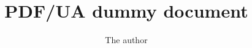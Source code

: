 \documentclass{article}
\title{PDF/UA dummy document}
\author{The author}
\begin{document}
\maketitle


\lipsum
\end{document}
